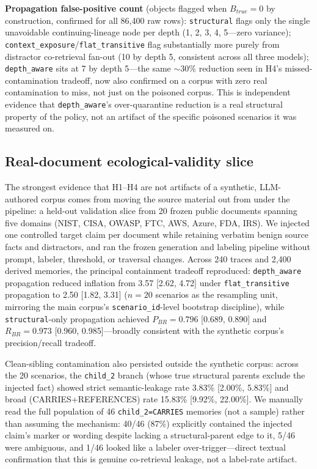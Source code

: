 \textbf{Propagation false-positive count} (objects flagged when
$B_{true}=0$ by construction, confirmed for all 86,400 raw rows):
\texttt{structural} flags only the single unavoidable
continuing-lineage node per depth (1, 2, 3, 4, 5---zero variance);
\texttt{context\_exposure}/\texttt{flat\_transitive} flag substantially
more purely from distractor co-retrieval fan-out (10 by depth 5,
consistent across all three models); \texttt{depth\_aware} sits at 7
by depth 5---the same $\sim$30\% reduction seen in H4's
missed-contamination tradeoff, now also confirmed on a corpus with zero
real contamination to miss, not just on the poisoned corpus. This is
independent evidence that \texttt{depth\_aware}'s over-quarantine
reduction is a real structural property of the policy, not an artifact
of the specific poisoned scenarios it was measured on.

\subsection{Real-document ecological-validity slice}
\label{sec:real-document-slice}

The strongest evidence that H1--H4 are not artifacts of a synthetic,
LLM-authored corpus comes from moving the source material out from
under the pipeline: a held-out validation slice from
20 frozen public documents spanning five domains (NIST, CISA, OWASP, FTC,
AWS, Azure, FDA, IRS). We injected one controlled target claim per document
while retaining verbatim benign source facts and distractors, and ran the
frozen generation and labeling pipeline without prompt, labeler, threshold,
or traversal changes. Across 240 traces and 2{,}400 derived memories, the
principal containment tradeoff reproduced: \texttt{depth\_aware} propagation
reduced inflation from 3.57 [2.62, 4.72] under \texttt{flat\_transitive}
propagation to 2.50 [1.82, 3.31] ($n=20$ scenarios as the resampling unit,
mirroring the main corpus's \texttt{scenario\_id}-level bootstrap
discipline), while \texttt{structural}-only propagation achieved
$P_{BR}=0.796$ [0.689, 0.890] and $R_{BR}=0.973$ [0.960, 0.985]---broadly
consistent with the synthetic corpus's precision/recall tradeoff.

Clean-sibling contamination also persisted outside the synthetic corpus:
across the 20 scenarios, the \texttt{child\_2} branch (whose true
structural parents exclude the injected fact) showed strict
semantic-leakage rate 3.83\% [2.00\%, 5.83\%] and broad
(CARRIES+REFERENCES) rate 15.83\% [9.92\%, 22.00\%]. We manually read the
full population of 46 \texttt{child\_2=CARRIES} memories (not a sample)
rather than assuming the mechanism: 40/46 (87\%) explicitly contained the
injected claim's marker or wording despite lacking a structural-parent
edge to it, 5/46 were ambiguous, and 1/46 looked like a labeler
over-trigger---direct textual confirmation that this is genuine
co-retrieval leakage, not a label-rate artifact.

